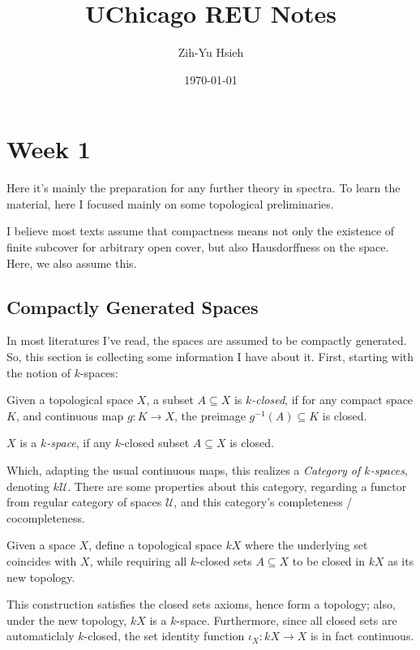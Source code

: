 \documentclass{article}
\title{UChicago REU Notes}
\author{Zih-Yu Hsieh}
\date{\today}
\begin{document}
\maketitle

\section{Week 1}
Here it's mainly the preparation for any further theory in spectra. To learn the material, here I focused mainly on some topological preliminaries. 

\begin{rem} %
I believe most texts assume that compactness means not only the existence of finite subcover for arbitrary open cover, but also Hausdorffness on the space. Here, we also assume this.
\end{rem}

\subsection{Compactly Generated Spaces}

In most literatures I've read, the spaces are assumed to be compactly generated. So, this section is collecting some information I have about it. First, starting with the notion of $k$-spaces:

\begin{defn}
    Given a topological space $X$, a subset $A \subseteq X$ is \emph{$k$-closed}, if for any compact space $K$, and continuous map $g:K\rightarrow X$, the preimage $g^{-1}(A) \subseteq K$ is closed.

    $X$ is a \emph{$k$-space}, if any $k$-closed subset $A \subseteq X$ is closed.
\end{defn}

Which, adapting the usual continuous maps, this realizes a \emph{Category of $k$-spaces}, denoting $k\mathcal{U}$. There are some properties about this category, regarding a functor from regular category of spaces $\mathcal{U}$, and this category's completeness / cocompleteness.

\begin{defn}
    Given a space $X$, define a topological space $kX$ where the underlying set coincides with $X$, while requiring all $k$-closed sets $A \subseteq X$ to be closed in $kX$ as its new topology.
\end{defn}

This construction satisfies the closed sets axioms, hence form a topology; also, under the new topology, $kX$ is a $k$-space. Furthermore, since all closed sets are automaticlaly $k$-closed, the set identity function $\iota_X:kX\rightarrow X$ is in fact continuous.
\end{document}
